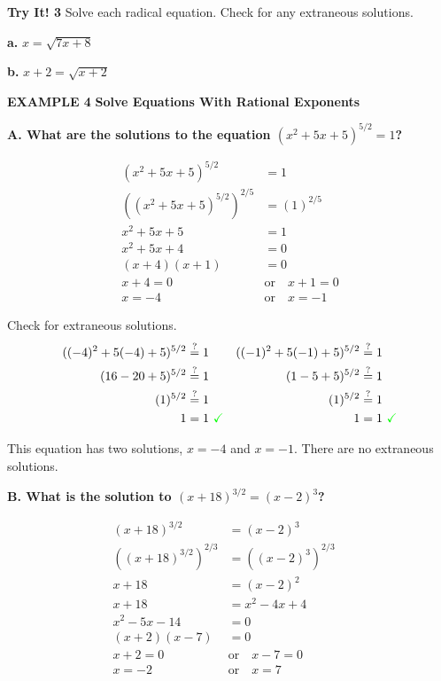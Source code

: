 \documentclass{article}
\newenvironment{example}[1]{\textbf{EXAMPLE #1}\quad}{}
\newenvironment{tryit}[1]{\textbf{Try It! #1}\quad}{}
\newcommand{\answer}[1]{}
\newcommand{\te}[1]{}
\begin{document}
\begin{tryit}{3}
Solve each radical equation. Check for any extraneous solutions.

\textbf{a.} $x = \sqrt{7x + 8}$ \quad \answer{$x = 8$}

\textbf{b.} $x + 2 = \sqrt{x + 2}$ \quad \answer{$x = -1, -2$}
\end{tryit}

\clearpage

\begin{example}{4}
\textbf{Solve Equations With Rational Exponents}

\textbf{A. What are the solutions to the equation $(x^2 + 5x + 5)^{5/2} = 1$?}

\begin{align*}
(x^2 + 5x + 5)^{5/2} &= 1 \\
((x^2 + 5x + 5)^{5/2})^{2/5} &= (1)^{2/5} \quad \text{\te{Raise both sides to the reciprocal power.}} \\
x^2 + 5x + 5 &= 1 \\
x^2 + 5x + 4 &= 0 \\
(x + 4)(x + 1) &= 0 \quad \text{\te{Use the Zero-Product Property.}} \\
x + 4 = 0 \quad &\text{or} \quad x + 1 = 0 \\
x = -4 \quad &\text{or} \quad x = -1
\end{align*}

Check for extraneous solutions.
\begin{align*}
((-4)^2 + 5(-4) + 5)^{5/2} &\stackrel{?}{=} 1 & ((-1)^2 + 5(-1) + 5)^{5/2} &\stackrel{?}{=} 1 \\
(16 - 20 + 5)^{5/2} &\stackrel{?}{=} 1 & (1 - 5 + 5)^{5/2} &\stackrel{?}{=} 1 \\
(1)^{5/2} &\stackrel{?}{=} 1 & (1)^{5/2} &\stackrel{?}{=} 1 \\
1 &= 1 \ \text{\textcolor{green}{\checkmark}} & 1 &= 1 \ \text{\textcolor{green}{\checkmark}}
\end{align*}

This equation has two solutions, $x = -4$ and $x = -1$. There are no extraneous solutions.

\textbf{B. What is the solution to $(x + 18)^{3/2} = (x - 2)^3$?}

\begin{align*}
(x + 18)^{3/2} &= (x - 2)^3 \\
((x + 18)^{3/2})^{2/3} &= ((x - 2)^3)^{2/3} \quad \text{\te{Raise both sides to the reciprocal power.}} \\
x + 18 &= (x - 2)^2 \\
x + 18 &= x^2 - 4x + 4 \\
x^2 - 5x - 14 &= 0 \\
(x + 2)(x - 7) &= 0 \quad \text{\te{Use the Zero-Product Property.}} \\
x + 2 = 0 \quad &\text{or} \quad x - 7 = 0 \\
x = -2 \quad &\text{or} \quad x = 7
\end{align*}


\end{example}
\end{document}
